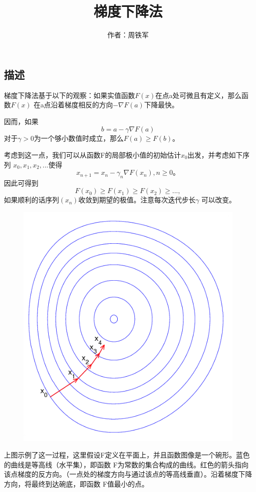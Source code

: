 \documentclass[12pt,a4paper]{article}
\title{梯度下降法}
\author{作者：周铁军}
\date{\chntoday}
\begin{document}
\maketitle
\newpage
\subsection{描述}
梯度下降法基于以下的观察：如果实值函数$F(x)$在点a处可微且有定义，那么函数$F(x)$
在a点沿着梯度相反的方向$-\nabla F(a)$下降最快。

因而，如果
\begin{equation}
	b=a-\gamma\nabla F(a)
\end{equation}
对于$\gamma>0$为一个够小数值时成立，那么$F(a)\ge F(b)$。

考虑到这一点，我们可以从函数F的局部极小值的初始估计$x_0$出发，并考虑如下序列
$x_0,x_1,x_2,...$使得
\begin{equation}
	x_{n+1}=x_n-\gamma_n \nabla F(x_n),n \ge 0。
\end{equation}
因此可得到
\begin{equation}
	F(x_0) \ge F(x_1) \ge F(x_2) \ge ...,
\end{equation}
如果顺利的话序列$(x_n)$收敛到期望的极值。注意每次迭代步长$\gamma$
可以改变。

\begin{figure}[H]
\centering
\includegraphics[scale=0.5]{./figures/Figure_2.png}
\end{figure}
上图示例了这一过程，这里假设F定义在平面上，并且函数图像是一个碗形。蓝色的曲线是等高线（水平集），即函数 F为常数的集合构成的曲线。红色的箭头指向该点梯度的反方向。（一点处的梯度方向与通过该点的等高线垂直）。沿着梯度下降方向，将最终到达碗底，即函数 F值最小的点。
\end{document}
